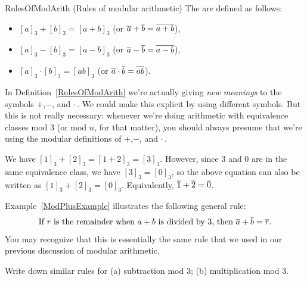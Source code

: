 \begin{defn}{RulesOfModArith} (Rules of modular arithmetic)
The  are defined as follows:
\begin{itemize}
\item $[a]_3 + [b]_3 = [a+b]_3$ \qquad (or $\overline{a} + \overline{b} = \overline{a + b}$),
\item $[a]_3 - [b]_3 = [a-b]_3$ \qquad (or $\overline{a} - \overline{b} = \overline{a - b}$),
\item $[a]_3 \cdot [b]_3 = [ab]_3$ \qquad (or $\overline{a} \cdot \overline{b} = \overline{a  b}$).
\end{itemize}
\end{defn}

In Definition~\ref{RulesOfModArith} we're actually giving \emph{new meanings} to the symbols $+$,$-$, and $\cdot$\,. We could make this explicit by using different symbols. But this is not really necessary: whenever we're doing arithmetic with equivalence classes mod 3 (or mod $n$, for that matter), you should always presume that we're using the modular definitions of $+$,$-$, and $\cdot$\,.

\begin{eg}\label{ModPlusExample}
We have $[1]_3 + [2]_3 = [1 + 2]_3 = [3]_3$. However, since 3 and 0 are in the same equivalence class, we have $[3]_3 = [0]_3$, so the above equation can also be written as $[1]_3 + [2]_3 = [0]_3$. Equivalently, $\overline{1} + \overline{2} = \overline{0}$.
\end{eg}

Example~\ref{ModPlusExample} illustrates the following general rule:
$$ \text{%
 If $r$ is the remainder when $a + b$ is divided by $3$, then $\class{a} + \class{b} = \class{r}$.} $$
You may recognize that this is essentially the same rule that we used in our previous discussion of modular arithmetic.

\begin{exercise}{47}
Write down similar rules for (a) subtraction mod 3; (b) multiplication mod 3.
\end{exercise}

